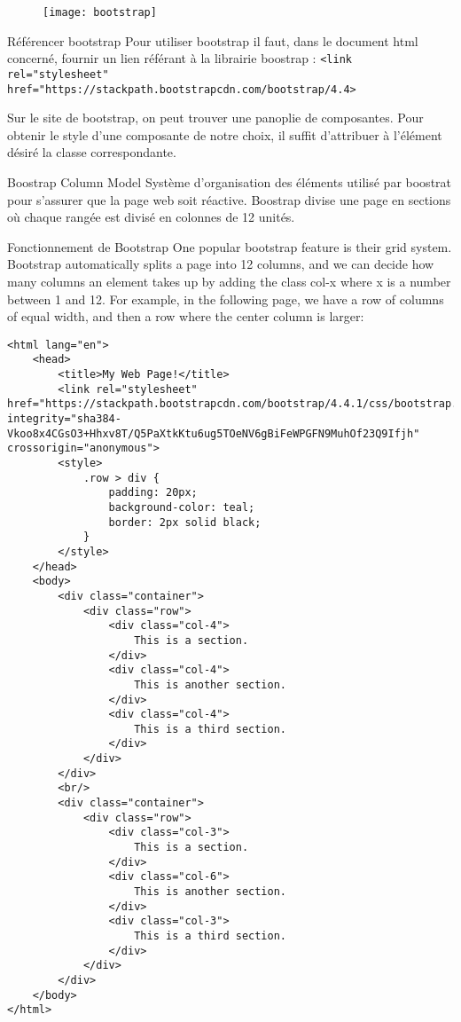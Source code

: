 \documentclass{report}
\begin{document}
\begin{figure}[H]
	\centering
	\texttt{[image: bootstrap]}
	
\end{figure}

\begin{Syntaxe*}{Référencer bootstrap}{}
Pour utiliser bootstrap il faut, dans le document html concerné, fournir un lien référant à la librairie 
boostrap : \texttt{\footnotesize{<link rel="stylesheet" href="https://stackpath.bootstrapcdn.com/bootstrap/4.4>}}

\end{Syntaxe*}
\noindent Sur le site de bootstrap, on peut trouver une panoplie de composantes. Pour obtenir le style d'une composante de 
notre choix, il suffit d'attribuer à l'élément désiré la classe correspondante. 

\begin{DefG*}{Boostrap Column Model}{}
	Système d'organisation des éléments utilisé par boostrat pour s'assurer que la page web soit réactive.
	Boostrap divise une page en sections où chaque rangée est divisé en colonnes de 12 unités.
\end{DefG*}
\begin{Remarque*}{Fonctionnement de Bootstrap}{}
One popular bootstrap feature is their grid system. Bootstrap automatically splits a page into 12 columns, and we can decide how many columns an element takes up by adding the class col-x where x is a number between 1 and 12. For example, in the following page, we have a row of columns of equal width, and then a row where the center column is larger:
\end{Remarque*}
\begin{ExampleDdHTML*}{}{}
  \begin{lstlisting}[style=HTMLDraculaDark] 
  <html lang="en">
    <head>
        <title>My Web Page!</title>
        <link rel="stylesheet" href="https://stackpath.bootstrapcdn.com/bootstrap/4.4.1/css/bootstrap.min.css" integrity="sha384-Vkoo8x4CGsO3+Hhxv8T/Q5PaXtkKtu6ug5TOeNV6gBiFeWPGFN9MuhOf23Q9Ifjh" crossorigin="anonymous">
        <style>
            .row > div {
                padding: 20px;
                background-color: teal;
                border: 2px solid black;
            }
        </style>
    </head>
    <body>
        <div class="container">
            <div class="row">
                <div class="col-4">
                    This is a section.
                </div>
                <div class="col-4">
                    This is another section.
                </div>
                <div class="col-4">
                    This is a third section.
                </div>
            </div>
        </div>
        <br/>
        <div class="container">
            <div class="row">
                <div class="col-3">
                    This is a section.
                </div>
                <div class="col-6">
                    This is another section.
                </div>
                <div class="col-3">
                    This is a third section.
                </div>
            </div>
        </div>
    </body>
</html>  \end{lstlisting}
\end{ExampleDdHTML*}
\end{document}
